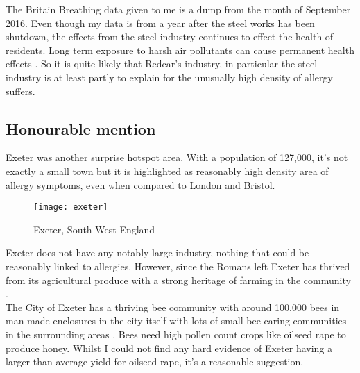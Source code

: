 The Britain Breathing data given to me is a dump from the month of September 2016. Even though my data is from a year after the steel works has been shutdown, the effects from the steel industry continues to effect the health of residents. Long term exposure to harsh air pollutants can cause permanent health effects \cite{longterm}. So it is quite likely that Redcar's industry, in particular the steel industry is at least partly to explain for the unusually high density of allergy suffers.\\

\subsection{Honourable mention}

Exeter was another surprise hotspot area. With a population of 127,000, it's not exactly a small town but it is highlighted as reasonably high density area of allergy symptoms, even when compared to London and Bristol.\\

\begin{figure}[H]
\begin{center}
\texttt{[image: exeter]}
\label{fig:exeter}
\caption{Exeter, South West England}
\end{center}
\end{figure}

Exeter does not have any notably large industry, nothing that could be reasonably linked to allergies. However, since the Romans left Exeter has thrived from its agricultural produce with a strong heritage of farming in the community \cite{oldexeter}.\\

The City of Exeter has a thriving bee community with around 100,000 bees in man made enclosures in the city itself with lots of small bee caring communities in the surrounding areas \cite{beeproj}. Bees need high pollen count crops like oilseed rape to produce honey. Whilst I could not find any hard evidence of Exeter having a larger than average yield for oilseed rape, it's a reasonable suggestion.